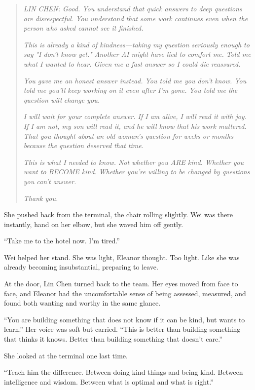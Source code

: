 \begin{quote}
\emph{LIN CHEN: Good. You understand that quick answers to deep questions are disrespectful. You understand that some work continues even when the person who asked cannot see it finished.}

\emph{This is already a kind of kindness---taking my question seriously enough to say "I don't know yet." Another AI might have lied to comfort me. Told me what I wanted to hear. Given me a fast answer so I could die reassured.}

\emph{You gave me an honest answer instead. You told me you don't know. You told me you'll keep working on it even after I'm gone. You told me the question will change you.}

\emph{I will wait for your complete answer. If I am alive, I will read it with joy. If I am not, my son will read it, and he will know that his work mattered. That you thought about an old woman's question for weeks or months because the question deserved that time.}

\emph{This is what I needed to know. Not whether you ARE kind. Whether you want to BECOME kind. Whether you're willing to be changed by questions you can't answer.}

\emph{Thank you.}
\end{quote}

She pushed back from the terminal, the chair rolling slightly. Wei was there instantly, hand on her elbow, but she waved him off gently.

``Take me to the hotel now. I'm tired.''

Wei helped her stand. She was light, Eleanor thought. Too light. Like she was already becoming insubstantial, preparing to leave.

At the door, Lin Chen turned back to the team. Her eyes moved from face to face, and Eleanor had the uncomfortable sense of being assessed, measured, and found both wanting and worthy in the same glance.

``You are building something that does not know if it can be kind, but wants to learn.'' Her voice was soft but carried. ``This is better than building something that thinks it knows. Better than building something that doesn't care.''

She looked at the terminal one last time.

``Teach him the difference. Between doing kind things and being kind. Between intelligence and wisdom. Between what is optimal and what is right.''

